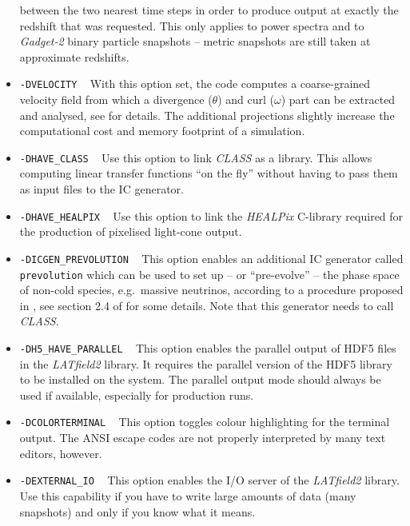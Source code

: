 \documentclass[a4paper,10pt]{article}
\begin{document}
\begin{itemize}
 between the two nearest time steps in order to produce output at exactly the redshift that was requested. This only applies to power spectra and to \textit{Gadget-2} binary particle snapshots -- metric snapshots are still taken at approximate redshifts.
 \item[] \hspace{-25pt}\texttt{-DVELOCITY} ~ With this option set, the code computes a coarse-grained velocity field from which a divergence ($\mathsf{\theta}$) and curl ($\mathsf{\omega}$) part can be extracted and analysed, see \cite{Jelic-Cizmek:2018gdp} for details. The additional projections slightly increase the computational cost and memory footprint of a simulation.
 \item[] \hspace{-25pt}\texttt{-DHAVE\_CLASS} ~ Use this option to link \textit{CLASS} as a library. This allows computing linear transfer functions ``on the fly'' without having to pass them as input files to the IC generator.
 \item[] \hspace{-25pt}\texttt{-DHAVE\_HEALPIX} ~ Use this option to link the \textit{HEALPix} C-library required for the production of
 pixelised light-cone output.
 \item[] \hspace{-25pt}\texttt{-DICGEN\_PREVOLUTION} ~ This option enables an additional IC generator called \texttt{prevolution} which can 
 be used to set up -- or ``pre-evolve'' -- the phase space of non-cold species, e.g.\ massive neutrinos, according to a procedure proposed in \cite{Ma:1993xs}, see
section 2.4 of \cite{Adamek:2017uiq} for some details. Note that this generator needs to call \textit{CLASS}.
 \item[] \hspace{-25pt}\texttt{-DH5\_HAVE\_PARALLEL} ~ This option enables the parallel output of HDF5 files in the \textit{LATfield2} 
 library. It requires the parallel version of the HDF5 library to be installed on the system. The parallel output mode should always be used if available, especially for production runs.
 \item[] \hspace{-25pt}\texttt{-DCOLORTERMINAL} ~ This option toggles colour highlighting for the terminal output. The ANSI escape codes are not properly interpreted by many text editors, however.
 \item[] \hspace{-25pt}\texttt{-DEXTERNAL\_IO} ~ This option enables the I/O server of the \textit{LATfield2} library. Use this capability if you have to write large amounts of data (many snapshots) and only if you know what it means.
\end{itemize}
\end{document}
